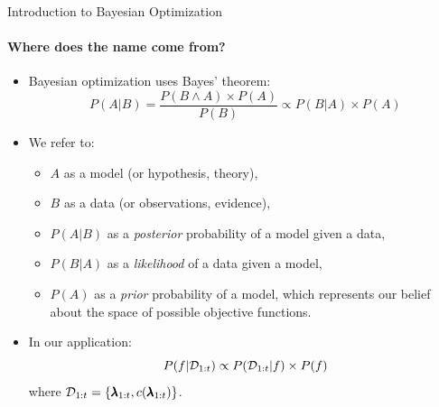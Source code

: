 \begin{frame}[c]{Introduction to Bayesian Optimization}
\framesubtitle{Where does the name come from?}

\begin{itemize}
    \item <+-> Bayesian optimization uses Bayes' theorem: 
    	\begin{equation*}
    	    P(A \vert B) = \frac{P(B \wedge A) \times  P(A)}{P(B)}
    	    \propto P(B \vert A) \times  P(A)
    	\end{equation*} 
    \item <+-> We refer to:
        \begin{itemize}
            \item $A$ as a model (or hypothesis, theory), 
            \item $B$ as a data (or observations, evidence),
            \item $P(A \vert B)$ as a \emph{posterior} probability of a model given a data,
            \item $P(B \vert A)$ as a \emph{likelihood} of a data given a model, 
            \item $P(A)$ as a \emph{prior} probability of a model, which represents our belief about the space of possible objective functions. 
        \end{itemize}
    \item <+-> In our application:
        \begin{equation*}
            P(f \vert \mathcal{D}_{1:t}) \propto P(\mathcal{D}_{1:t} \vert f) \times P(f)
        \end{equation*} 
        where $\mathcal{D}_{1:t} = \left \{ \pmb{\lambda}_{1:t}, c(\pmb{\lambda}_{1:t}) \right \}$.
\end{itemize}
\end{frame}
